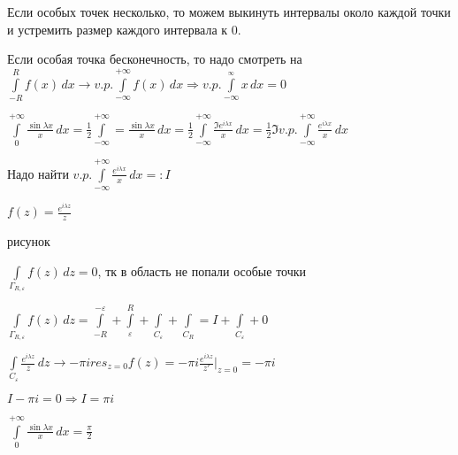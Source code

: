 Если особых точек несколько, то можем выкинуть интервалы около каждой точки и устремить размер каждого интервала к 0.

Если особая точка бесконечность, то надо смотреть на $\int\limits_{-R}^{R} f(x)\,dx \to v.p. \int\limits_{-\infty}^{+\infty}f(x)\,dx \Rightarrow v.p. \int\limits_{-\infty}^{_\infty} x \,dx = 0$ 

\begin{example}\thmslashn
	
	$\int\limits_{0}^{+\infty}\frac{\sin \lambda x}{x} \,dx = \frac{1}{2} \int\limits_{-\infty}^{+\infty} = \frac{\sin \lambda x}{x}\,dx = \frac{1}{2}\int\limits_{-\infty}^{+\infty}\frac{\Im e^{i\lambda x}}{x}\,dx = \frac{1}{2} \Im v.p. \int\limits_{-\infty}^{+\infty} \frac{e^{i\lambda x}}{x}\,dx$
	
	Надо найти $v.p. \int\limits_{-\infty}^{+\infty} \frac{e^{i\lambda x}}{x}\,dx =: I$
	
	$f(z) = \frac{e^{i\lambda z}}{z}$
	
	\TODO рисунок
	
	$\int\limits_{\Gamma_{R, \varepsilon}} f(z)\,dz = 0$, тк в область не попали особые точки
	
	$\int\limits_{\Gamma_{R, \varepsilon}} f(z)\,dz = \int\limits_{-R}^{-\varepsilon} + \int\limits_{\varepsilon}^{R} + \int\limits_{C_{\varepsilon}} + \int\limits_{C_R} = I + \int\limits_{C_{\varepsilon}}  + 0$
	
	$\int\limits_{C_{\varepsilon}} \frac{e^{i\lambda z}}{z} \,dz \to -\pi i res_{z = 0} f(z) = -\pi i \frac{e^{i\lambda z}}{z'}\Big|_{z = 0} = -\pi i$
	
	$I - \pi i = 0 \Rightarrow I = \pi i$
	
	$\int\limits_{0}^{+\infty}\frac{\sin \lambda x}{x} \,dx = \frac{\pi}{2}$
	
\end{example}


